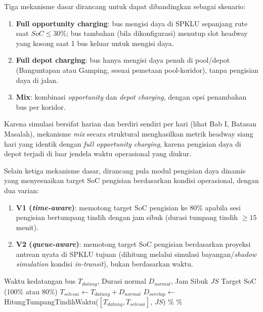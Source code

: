 Tiga mekanisme dasar dirancang untuk dapat dibandingkan sebagai skenario:
\begin{enumerate}
	\item \textbf{Full opportunity charging}: bus mengisi daya di SPKLU
	sepanjang rute saat $SoC \leq 30\%$; bus tambahan (bila dikonfigurasi)
	menutup slot headway yang kosong saat 1 bus keluar untuk mengisi daya.
	\item \textbf{Full depot charging}: bus hanya mengisi daya penuh di
	pool/depot (Banguntapan atau Gamping, sesuai pemetaan pool-koridor),
	tanpa pengisian daya di jalan.
	\item \textbf{Mix}: kombinasi \textit{opportunity} dan \textit{depot
		charging}, dengan opsi penambahan bus per koridor.
\end{enumerate}
Karena simulasi bersifat harian dan berdiri sendiri per hari (lihat Bab I,
Batasan Masalah), mekanisme \textit{mix} secara struktural menghasilkan
metrik headway siang hari yang identik dengan \textit{full opportunity
	charging}, karena pengisian daya di depot terjadi di luar jendela waktu
operasional yang diukur.

Selain ketiga mekanisme dasar, dirancang pula modul pengisian daya dinamis
yang menyesuaikan target SoC pengisian berdasarkan kondisi operasional,
dengan dua varian:
\begin{enumerate}
	\item \textbf{V1 (\textit{time-aware})}: memotong target SoC pengisian ke
	80\% apabila sesi pengisian bertumpang tindih dengan jam sibuk (durasi
	tumpang tindih $\geq 15$ menit).
	\item \textbf{V2 (\textit{queue-aware})}: memotong target SoC pengisian
	berdasarkan proyeksi antrean nyata di SPKLU tujuan (dihitung melalui
	simulasi bayangan/\textit{shadow simulation} kondisi \textit{in-transit}),
	bukan berdasarkan waktu.
\end{enumerate}

\begin{algorithm}[h]
\caption{Algoritma Pengisian Daya Dinamis V1 (\textit{Time-aware})}
\label{alg:dinamis-v1}
\begin{algorithmic}[1]
\Require Waktu kedatangan bus $T_{datang}$, Durasi normal $D_{normal}$, Jam Sibuk $JS$
\Ensure Target SoC (100\% atau 80\%)
\State $T_{selesai} \gets T_{datang} + D_{normal}$
\State $D_{overlap} \gets$ HitungTumpangTindihWaktu($[T_{datang}, T_{selesai}]$, $JS$)
    \State {}\%
\Else
    \State {}\%
\EndIf
\end{algorithmic}
\end{algorithm}

